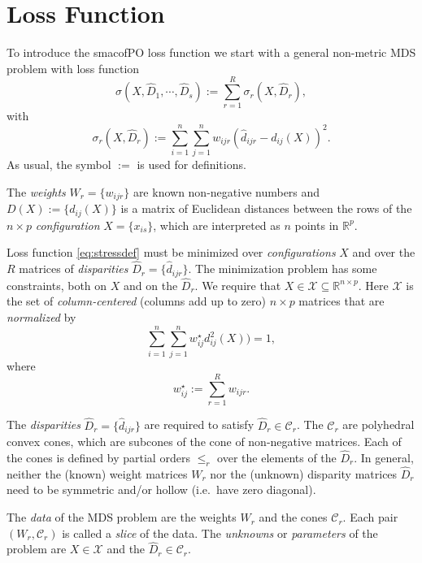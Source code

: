 \documentclass[
  12pt,
]{article}
\begin{document}
\section{Loss Function}\label{loss-function}

To introduce the smacofPO loss function we start with a general non-metric MDS problem with
loss function
\begin{equation}
\sigma(X,\hat D_1,\cdots,\hat D_s):=\sum_{r=1}^R\sigma_r(X,\hat D_r),
\label{eq:stressdef}
\end{equation}
with
\begin{equation}
\sigma_r(X,\hat D_r):=\sum_{i=1}^n\sum_{j=1}^n w_{ijr}(\hat d_{ijr}-d_{ij}(X))^2.
\label{eq:rstressdef}
\end{equation}
As usual, the symbol \(:=\) is used for definitions.

The \emph{weights} \(W_r=\{w_{ijr}\}\) are known non-negative
numbers and \(D(X):=\{d_{ij}(X)\}\) is a matrix of Euclidean distances
between the rows of the \(n\times p\) \emph{configuration} \(X=\{x_{is}\}\), which are interpreted as \(n\) points in \(\mathbb{R}^p\).

Loss function \eqref{eq:stressdef} must be minimized over \emph{configurations} \(X\) and over the \(R\) matrices of \emph{disparities} \(\hat D_r=\{\hat d_{ijr}\}\). The minimization problem has some constraints, both on \(X\) and on the \(\hat D_r\).
We require that \(X\in\mathcal{X}\subseteq\mathbb{R}^{n\times p}\). Here \(\mathcal{X}\) is the set of \emph{column-centered} (columns add up to zero) \(n\times p\) matrices that are \emph{normalized} by
\begin{equation}
\sum_{i=1}^n\sum_{j=1}^n w_{ij}^\star d_{ij}^2(X))=1,
\label{eq:xscale}
\end{equation}
where
\begin{equation}
w_{ij}^\star:=\sum_{r=1}^R w_{ijr}.
\label{eq:wstardef}
\end{equation}

The \emph{disparities} \(\hat D_r=\{\hat d_{ijr}\}\) are required to satisfy \(\hat D_r\in\mathcal{C}_r\). The \(\mathcal{C}_r\) are polyhedral convex cones, which are subcones of the cone of non-negative matrices. Each of the cones is defined by partial orders \(\leq_r\) over the elements of the \(\hat D_r\). In general, neither the (known) weight matrices \(W_r\) nor the (unknown) disparity matrices \(\hat D_r\) need to be symmetric and/or hollow (i.e.~have zero diagonal).

The \emph{data} of the MDS problem are the weights \(W_r\) and the cones \(\mathcal{C}_r\). Each pair \((W_r,\mathcal{C}_r)\) is called a \emph{slice} of the data. The \emph{unknowns} or \emph{parameters} of the problem are \(X\in\mathcal{X}\) and the \(\hat D_r\in\mathcal{C}_r\).
\end{document}
